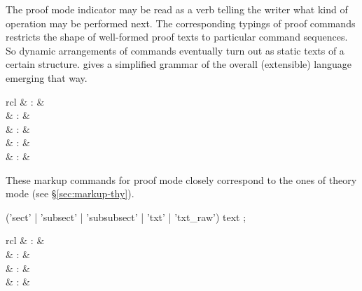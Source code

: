 \begin{isabellebody}
\begin{isamarkuptext}
  The proof mode indicator may be read as a verb telling the writer
  what kind of operation may be performed next.  The corresponding
  typings of proof commands restricts the shape of well-formed proof
  texts to particular command sequences.  So dynamic arrangements of
  commands eventually turn out as static texts of a certain structure.
   gives a simplified grammar of the overall
  (extensible) language emerging that way.%
\end{isamarkuptext}%
\isamarkuptrue%
%
\isamarkuptrue%
%
\begin{isamarkuptext}%
\begin{matharray}{rcl}
    \mbox{} & : &  \\
    \mbox{} & : &  \\
    \mbox{} & : &  \\
    \mbox{} & : &  \\
    \mbox{} & : &  \\
  \end{matharray}

  These markup commands for proof mode closely correspond to the ones
  of theory mode (see \S\ref{sec:markup-thy}).

  \begin{rail}
    ('sect' | 'subsect' | 'subsubsect' | 'txt' | 'txt\_raw') text
    ;
  \end{rail}%
\end{isamarkuptext}%
\isamarkuptrue%
%
\isamarkuptrue%
%
\begin{isamarkuptext}%
\begin{matharray}{rcl}
    \mbox{} & : &  \\
    \mbox{} & : &  \\
    \mbox{} & : &  \\
    \mbox{} & : &  \\
  \end{matharray}


\end{isamarkuptext}
\end{isabellebody}
